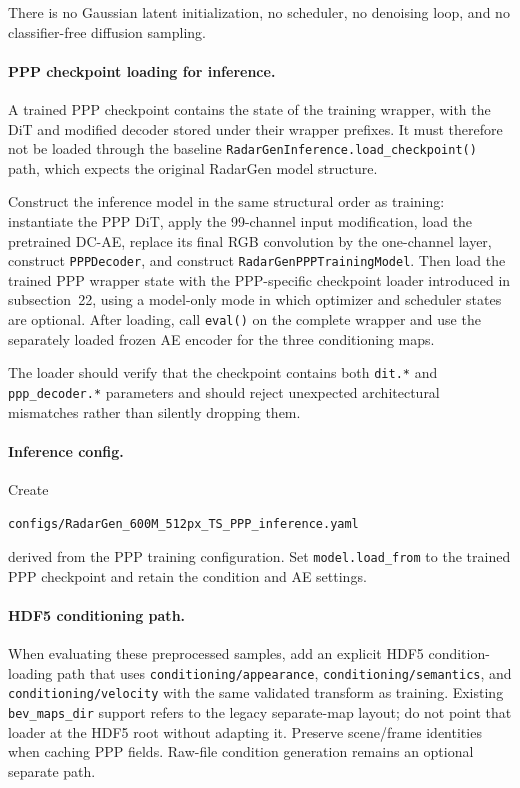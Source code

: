 \documentclass[11pt,a4paper]{article}
\begin{document}
There is no Gaussian latent initialization, no scheduler, no denoising loop, and no classifier-free diffusion sampling.

\paragraph{PPP checkpoint loading for inference.}
A trained PPP checkpoint contains the state of the training wrapper, with the DiT and modified decoder stored under their wrapper prefixes. It must therefore not be loaded through the baseline \texttt{RadarGenInference.load\_checkpoint()} path, which expects the original RadarGen model structure.

Construct the inference model in the same structural order as training: instantiate the PPP DiT, apply the 99-channel input modification, load the pretrained DC-AE, replace its final RGB convolution by the one-channel layer, construct \texttt{PPPDecoder}, and construct \texttt{RadarGenPPPTrainingModel}. Then load the trained PPP wrapper state with the PPP-specific checkpoint loader introduced in subsection~22, using a model-only mode in which optimizer and scheduler states are optional. After loading, call \texttt{eval()} on the complete wrapper and use the separately loaded frozen AE encoder for the three conditioning maps.

The loader should verify that the checkpoint contains both \texttt{dit.*} and \texttt{ppp\_decoder.*} parameters and should reject unexpected architectural mismatches rather than silently dropping them.

\paragraph{Inference config.}
Create
\begin{lstlisting}
configs/RadarGen_600M_512px_TS_PPP_inference.yaml
\end{lstlisting}
derived from the PPP training configuration. Set \texttt{model.load\_from} to the trained PPP checkpoint and retain the condition and AE settings.

\paragraph{HDF5 conditioning path.}
When evaluating these preprocessed samples, add an explicit HDF5 condition-loading path that uses \texttt{conditioning/appearance}, \texttt{conditioning/semantics}, and \texttt{conditioning/velocity} with the same validated transform as training. Existing \texttt{bev\_maps\_dir} support refers to the legacy separate-map layout; do not point that loader at the HDF5 root without adapting it. Preserve scene/frame identities when caching PPP fields. Raw-file condition generation remains an optional separate path.
\end{document}
